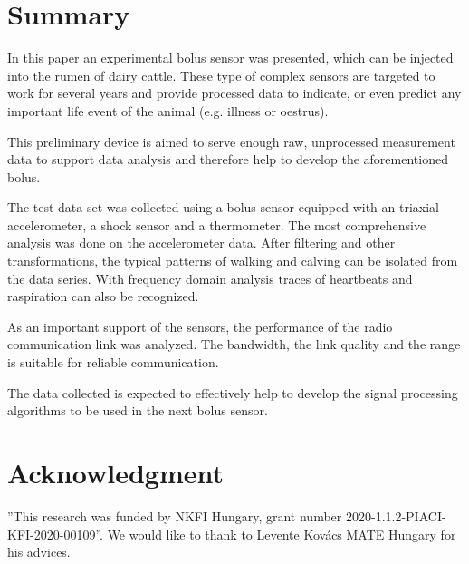 \documentclass[conference]{IEEEtran}
\begin{document}
\section{Summary}

In this paper an experimental bolus sensor was presented, which can be injected
into the rumen of dairy cattle. These type of complex sensors are targeted
to work for several years and provide processed data to indicate, or even
predict any important life event of the animal (e.g. illness or oestrus).

This preliminary device is aimed to serve enough raw, unprocessed measurement
data to support data analysis and therefore help to develop the aforementioned
bolus.

The test data set was collected using a bolus sensor equipped with an triaxial
accelerometer, a shock sensor and a thermometer. The most comprehensive analysis
was done on the accelerometer data. After filtering and other transformations,
the typical patterns of walking and calving
can be isolated from the data series. With frequency domain analysis traces of
heartbeats and raspiration can also be recognized.

As an important support of the
sensors, the performance of the radio communication link was analyzed. The bandwidth,
the link quality and the range is suitable for reliable communication.

The data collected is expected to effectively help to develop the signal processing
algorithms to be used in the next bolus sensor.

\section*{Acknowledgment}

''This research was funded by NKFI Hungary, grant number
2020-1.1.2-PIACI-KFI-2020-00109''. We would like to thank to Levente Kovács
MATE Hungary for his advices.



\end{document}
